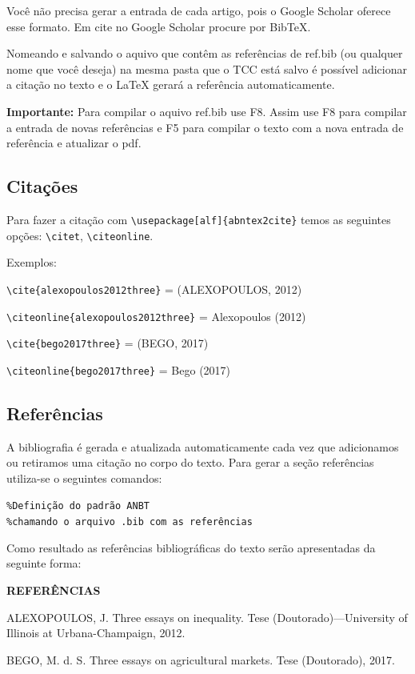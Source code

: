 \documentclass[12pt,oneside,a4paper,chapter=TITLE,english,brazil,sumario=abnt-6027-2012]{abntex2}
\begin{document}
Você não precisa gerar a entrada de cada artigo, pois o Google Scholar oferece esse formato. Em cite no Google Scholar procure por BibTeX. 

Nomeando e salvando o aquivo que contêm as referências de ref.bib (ou qualquer nome que você deseja) na mesma pasta que o TCC está salvo é possível adicionar a citação no texto e o \LaTeX \hspace{0.1cm} gerará a referência automaticamente. 

	{{\bfseries Importante:} Para compilar o aquivo ref.bib use F8}. Assim use F8 para compilar a entrada de novas referências e F5  para compilar o texto com a nova entrada de referência e atualizar o pdf.  

\subsection{Citações}

Para fazer a citação com \verb|\usepackage[alf]{abntex2cite}| temos as seguintes opções: \verb|\citet|,  \verb|\citeonline|.

Exemplos: 

\verb|\cite{alexopoulos2012three}| = (ALEXOPOULOS, 2012)

\verb|\citeonline{alexopoulos2012three}| = Alexopoulos (2012)

\verb|\cite{bego2017three}| = (BEGO, 2017)

\verb|\citeonline{bego2017three}| = Bego (2017)

\subsection{Referências}

A bibliografia é gerada e atualizada automaticamente cada vez que adicionamos ou retiramos uma citação no corpo do texto. Para gerar a seção referências utiliza-se o seguintes comandos:  

\vspace{1cm}
{
	\noindent
	\verb|%Definição do padrão ANBT| \\
	\verb|%chamando o arquivo .bib com as referências | \\
}

Como resultado as referências bibliográficas do texto serão apresentadas da seguinte forma: 

\vspace{1cm}
\begin{center}
	\large \bfseries REFERÊNCIAS
\end{center}

{
\noindent
ALEXOPOULOS, J. Three essays on inequality. Tese (Doutorado)—University of Illinois at
Urbana-Champaign, 2012.

\noindent
BEGO, M. d. S. Three essays on agricultural markets. Tese (Doutorado), 2017.
}
\end{document}
